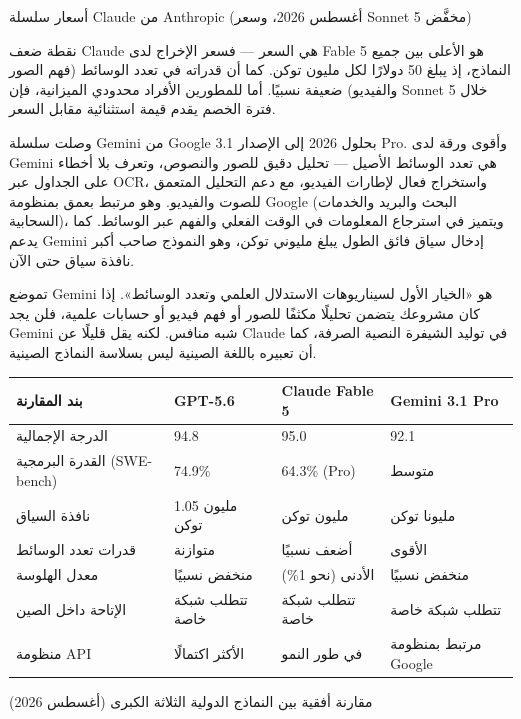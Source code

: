 \begin{center}\small\color{gray}أسعار سلسلة Claude من Anthropic (أغسطس 2026، وسعر Sonnet 5 مخفَّض)\end{center}

نقطة ضعف Claude هي السعر — فسعر الإخراج لدى Fable 5 هو الأعلى بين جميع النماذج، إذ يبلغ 50 دولارًا لكل مليون توكن. كما أن قدراته في تعدد الوسائط (فهم الصور والفيديو) ضعيفة نسبيًا. أما للمطورين الأفراد محدودي الميزانية، فإن Sonnet 5 خلال فترة الخصم يقدم قيمة استثنائية مقابل السعر.


وصلت سلسلة Gemini من Google بحلول 2026 إلى الإصدار 3.1 Pro. وأقوى ورقة لدى Gemini هي تعدد الوسائط الأصيل — تحليل دقيق للصور والنصوص، وتعرف بلا أخطاء على الجداول عبر OCR، واستخراج فعال لإطارات الفيديو، مع دعم التحليل المتعمق للصوت والفيديو. وهو مرتبط بعمق بمنظومة Google (البحث والبريد والخدمات السحابية)، ويتميز في استرجاع المعلومات في الوقت الفعلي والفهم عبر الوسائط. كما يدعم Gemini إدخال سياق فائق الطول يبلغ مليوني توكن، وهو النموذج صاحب أكبر نافذة سياق حتى الآن.

تموضع Gemini هو «الخيار الأول لسيناريوهات الاستدلال العلمي وتعدد الوسائط». إذا كان مشروعك يتضمن تحليلًا مكثفًا للصور أو فهم فيديو أو حسابات علمية، فلن يجد Gemini شبه منافس. لكنه يقل قليلًا عن Claude في توليد الشيفرة النصية الصرفة، كما أن تعبيره باللغة الصينية ليس بسلاسة النماذج الصينية.

\begin{center}
\begin{tabularx}{\linewidth}{|X|X|X|X|}
\hline
\textbf{بند المقارنة} & \textbf{GPT-5.6} & \textbf{Claude Fable 5} & \textbf{Gemini 3.1 Pro} \tabularnewline
\hline
الدرجة الإجمالية & 94.8 & 95.0 & 92.1 \tabularnewline
القدرة البرمجية (SWE-bench) & 74.9\% & 64.3\% (Pro) & متوسط \tabularnewline
نافذة السياق & 1.05 مليون توكن & مليون توكن & مليونا توكن \tabularnewline
قدرات تعدد الوسائط & متوازنة & أضعف نسبيًا & الأقوى \tabularnewline
معدل الهلوسة & منخفض نسبيًا & الأدنى (نحو 1\%) & منخفض نسبيًا \tabularnewline
الإتاحة داخل الصين & تتطلب شبكة خاصة & تتطلب شبكة خاصة & تتطلب شبكة خاصة \tabularnewline
منظومة API & الأكثر اكتمالًا & في طور النمو & مرتبط بمنظومة Google \tabularnewline
\hline
\end{tabularx}
\end{center}

\begin{center}\small\color{gray}مقارنة أفقية بين النماذج الدولية الثلاثة الكبرى (أغسطس 2026)\end{center}


